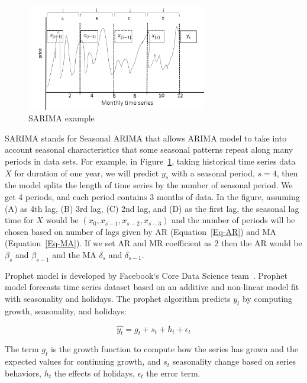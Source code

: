 \documentclass[graybox]{svmult}
\begin{document}
\begin{figure}
\centering\includegraphics[width=0.7\textwidth]{figures/SARIMA.png}\caption{SARIMA example}\label{fig:sarima}
\end{figure}

SARIMA stands for Seasonal ARIMA that allows ARIMA model to take into account seasonal characteristics that some seasonal patterns repeat along many periods in data sets. For example, in Figure~\ref{fig:sarima}, taking historical time series data \(X\) for duration of one year, we will predict \(y_s\) with a seasonal period, \(s= 4\), then the model splits the length of time series by the number of seasonal period. We get 4 periods, and each period contains 3 months of data. In the figure, assuming (A) as 4th lag, (B) 3rd lag, (C) 2nd lag, and (D) as the first lag, the seasonal lag time for \(X\) would be \((x_{0}, x_{{s-1}}, x_{{s-2}}, x_{{s-3}} )\) and the number of periods will be chosen based on number of lags given by AR (Equation~\ref{Eq-AR}) and MA (Equation~\ref{Eq-MA}). If we set AR and MR coefficient as 2 then the AR would be \(\beta_{s}\) and \(\beta_{s-1}\) and the MA \(\delta_{s}\) and \(\delta_{s-1}\).

Prophet model is developed by Facebook`s Core Data Science team~\cite{prophet}. Prophet model forecasts time series dataset based on an additive and non-linear model fit with seasonality and holidays. The prophet algorithm predicts \(y_t\) by computing growth, seasonality, and holidays:

\begin{equation}
\hat{y_t} = g_t + s_t +h_t+\epsilon_t
\label{Eq-prophet}
\end{equation}

The term \(g_t\) is the growth function to compute how the series has grown and the expected values for continuing growth, and \(s_t\) seasonality change based on series behaviors, \(h_t\) the effects of holidays, \(\epsilon_t\) the error term.
\end{document}
